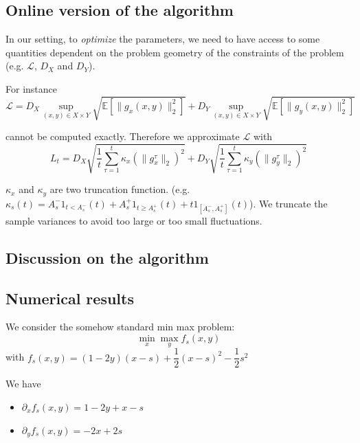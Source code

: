 \documentclass[12pt,reqno]{amsart}
\numberwithin{equation}{section}
\begin{document}
\subsection{Online version of the algorithm}

In our setting, to \emph{optimize} the parameters, we need to have access to some quantities dependent on the problem geometry of the constraints of the problem (e.g. $\mathcal{L}$, $D_{X}$ and $D_{Y}$).

For instance
$$
\mathcal{L} = D_{X} \sup_{(x,y) \in X \times Y} \sqrt{\mathbb{E}[\lVert g_{x}(x,y) \rVert_{2}^{2}]} + 
D_{Y} \sup_{(x,y) \in X \times Y} \sqrt{\mathbb{E}[\lVert g_{y}(x,y) \rVert_{2}^{2}]}
$$

cannot be computed exactly.
Therefore we approximate $\mathcal{L}$ with  
$$
L_{t} = D_{X}\sqrt{\dfrac{1}{t}\sum_{\tau=1}^{t}\kappa_{x}(\lVert g_{x}^{\tau} \rVert_{2})^{2}} + D_{Y}\sqrt{\dfrac{1}{t}\sum_{\tau=1}^{t}  \kappa_{y}(\lVert g_{y}^{\tau} \rVert_{2})^{2}}
$$

$\kappa_{x}$ and $\kappa_{y}$ are two truncation function.
(e.g. $\kappa_{s}(t) = A_{s}^{-}1_{ t < A_{s}^{-}}(t) + A_{s}^{+}1_{ t \geq A_{s}^{+}}(t) + t 1_{ [A_{s}^{-}, A_{s}^{+}]}(t)$).
We truncate the sample variances to avoid too large or too small fluctuations.
%
%

\subsection{Discussion on the algorithm}

\subsection{Numerical results}

We consider the somehow standard min max problem:
$$
\min_{x}\max_{y} f_{s}(x,y)
$$
with $f_{s}(x,y) = (1 - 2y)(x - s) + \dfrac{1}{2}(x - s)^{2} - \dfrac{1}{2}s^{2} $

We have 

\begin{itemize}
\item $\partial_{x} f_{s}(x,y) = 1 - 2y + x - s$
\item $\partial_{y} f_{s}(x,y) = -2x + 2s$
\end{itemize}
\end{document}
